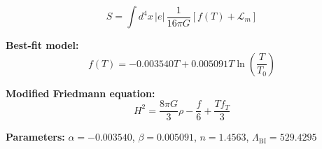 
\begin{equation}
  S = \int d^4x \, |e| \, \frac{1}{16\pi G} \left[ f(T) + \mathcal{L}_m \right]
\end{equation}

\textbf{Best-fit model:}
\begin{equation}
  f(T) = -0.003540 T + 0.005091 T \ln\!\left(\frac{T}{T_0}\right)
\end{equation}

\textbf{Modified Friedmann equation:}
\begin{equation}
  H^2 = \frac{8\pi G}{3} \rho - \frac{f}{6} + \frac{T f_T}{3}
\end{equation}

\textbf{Parameters:}
$\alpha = -0.003540$, \quad
$\beta = 0.005091$, \quad
$n = 1.4563$, \quad
$\Lambda_{\text{BI}} = 529.4295$